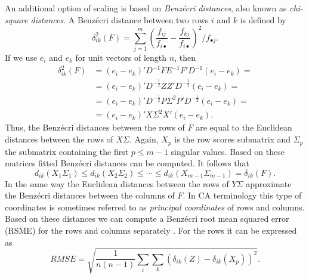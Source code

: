 \documentclass[article]{Z}
\begin{document}
An additional option of scaling is based on \emph{Benz\'ecri distances}, also known as \emph{chi-square distances}. A Benz\'ecri distance between two rows $i$ and $k$ is defined by
\begin{equation}
\delta_{ik}^2(F)=\sum_{j=1}^m\left(\frac{f_{ij}}{f_{i\bullet}}-\frac{f_{kj}}{f_{i\bullet}}\right)^2 /{f_{\bullet j}}. 
\end{equation}
If we use \(e_i\) and \(e_k\) for unit vectors of length \(n\), then
\begin{align*}
\delta_{ik}^2(F)&=(e_i-e_k)'D^{-1}FE^{-1}F'D^{-1}(e_i-e_k)=\\
&=(e_i-e_k)'D^{-\frac12}ZZ'D^{-\frac12}(e_i-e_k)=\\
&=(e_i-e_k)'D^{-\frac12}P\Sigma^2P'D^{-\frac12}(e_i-e_k)=\\
&=(e_i-e_k)'X\Sigma^2X'(e_i-e_k).
\end{align*}
Thus, the Benz\'ecri distances between the rows of \(F\) are equal to the Euclidean distances between the rows of \(X\Sigma\). Again, \(X_p\) is the row scores submatrix and \(\Sigma_p\) the submatrix containing the first $p \leq m-1$ singular values. Based on these matrices fitted Benz\'ecri distances can be computed. It follows that
\begin{equation}\label{E:below}
d_{ik}(X_1\Sigma_1)\leq d_{ik}(X_2\Sigma_2)\leq\cdots\leq d_{ik}(X_{m-1}\Sigma_{m-1})=\delta_{ik}(F).
\end{equation}
In the same way the Euclidean distances between the rows of \(Y\Sigma\) approximate the Benz\'ecri distances between the columns of \(F\). In CA terminology this type of coordinates is sometimes referred to as \emph{principal coordinates} of rows and columns. Based on these distances we can compute a Benz\'ecri root mean squared error (RSME) for the rows and columns separately \citep[see also][]{deLeeuw+Meulman:86}. For the rows it can be expressed as
\begin{equation}
RMSE = \sqrt{\frac{1}{n(n-1)}\sum_i\sum_k \left(\delta_{ik}(Z)-\delta_{ik}(X_p)\right)^2}.
\end{equation}
\end{document}
